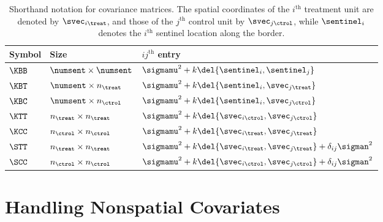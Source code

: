 \begin{table}[bp]
    \centering
    \bgroup
    \def\arraystretch{1.2}%
    \begin{tabular}{lll}
        \hline
        Symbol & Size                       & \(ij^{\mathrm{th}}\) entry                                                      \\ \hline
        \(\KBB\) & \(\numsent \times \numsent\) & \(\sigmamu^2 + k\del{\sentinel_i,\sentinel_j}\)                                 \\ 
        \(\KBT\) & \(\numsent \times n_\treat\) & \(\sigmamu^2 + k\del{\sentinel_i,\svec_{j\treat}}\)                             \\ 
        \(\KBC\) & \(\numsent \times n_\ctrol\) & \(\sigmamu^2 + k\del{\sentinel_i,\svec_{j\ctrol}}\)                             \\
        \(\KTT\) & \(n_\treat \times n_\treat\) & \(\sigmamu^2 + k\del{\svec_{i\ctrol},\svec_{j\ctrol}}\)                         \\
        \(\KCC\) & \(n_\ctrol \times n_\ctrol\) & \(\sigmamu^2 + k\del{\svec_{i\treat},\svec_{j\treat}}\)                         \\ 
        \(\STT\) & \(n_\treat \times n_\treat\) & \(\sigmamu^2 + k\del{\svec_{i\treat},\svec_{j\treat}} + \delta_{ij} \sigman^2\) \\ 
        \(\SCC\) & \(n_\ctrol \times n_\ctrol\) & \(\sigmamu^2 + k\del{\svec_{i\ctrol},\svec_{j\ctrol}} + \delta_{ij} \sigman^2\) \\
        \hline
    \end{tabular}
    \egroup
    \caption{
        Shorthand notation for covariance matrices. The spatial coordinates of the \(i^\mathrm{th}\) treatment unit are denoted by \(\svec_{i\treat}\),
and those of the \(j^\mathrm{th}\) control unit by \(\svec_{j\ctrol}\), while \(\sentinel_i\) denotes the \(i^\mathrm{th}\) sentinel location along the border.
        \label{table:notation}
    }
\end{table}

\section{Handling Nonspatial Covariates}
\label{sec:covariates}

